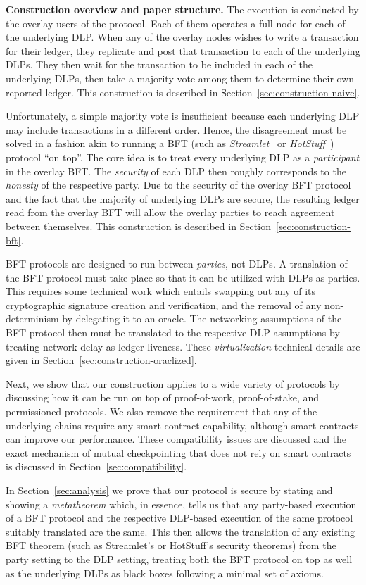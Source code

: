 \noindent
\textbf{Construction overview and paper structure.}
The execution is conducted by the overlay users of the protocol.
Each of them operates a full node for each of the underlying DLP.
When any of the overlay nodes wishes to write a transaction for
their ledger, they replicate and post that transaction to each of
the underlying DLPs. They then wait for the transaction to be included
in each of the underlying DLPs, then take a majority vote among them
to determine their own reported ledger. This construction is described
in Section~\ref{sec:construction-naive}.

Unfortunately, a simple majority vote is insufficient because each
underlying DLP may include transactions in a different order. Hence,
the disagreement must be solved in a fashion akin to running a BFT
(such as \emph{Streamlet}~\cite{streamlet} or \emph{HotStuff}~\cite{hotstuff})
protocol ``on top''. The core idea is to treat every underlying DLP
as a \emph{participant} in the overlay BFT. The \emph{security} of
each DLP then roughly corresponds to the \emph{honesty} of the
respective party. Due to the security of the overlay BFT protocol
and the fact that the majority of underlying DLPs are secure, the
resulting ledger read from the overlay BFT will allow the overlay
parties to reach agreement between themselves. This construction
is described in Section~\ref{sec:construction-bft}.

BFT protocols are designed to run between \emph{parties}, not DLPs.
A translation of the BFT protocol must take place so that it can be
utilized with DLPs as parties. This requires some technical work
which entails swapping out any of its cryptographic signature creation
and verification, and the removal of any non-determinism by delegating
it to an oracle. The networking assumptions of the BFT protocol then
must be translated to the respective DLP assumptions by treating
network delay as ledger liveness. These \emph{virtualization} technical
details are given in Section~\ref{sec:construction-oraclized}.

Next, we show that our construction applies to a wide variety of
protocols by discussing how it can be run on top of proof-of-work,
proof-of-stake, and permissioned protocols. We also remove the requirement
that any of the underlying chains require any smart contract capability,
although smart contracts can improve our performance. These compatibility
issues are discussed and the exact mechanism of mutual checkpointing
that does not rely on smart contracts is discussed in
Section~\ref{sec:compatibility}.

In Section~\ref{sec:analysis} we prove that our protocol is secure by
stating and showing a \emph{metatheorem} which, in essence, tells us that any
party-based execution of a BFT protocol and the respective DLP-based
execution of the same protocol suitably translated are the same. This
then allows the translation of any existing BFT theorem (such as Streamlet's
or HotStuff's security theorems) from the party setting to the DLP setting,
treating both the BFT protocol on top as well as the underlying DLPs as
black boxes following a minimal set of axioms.
